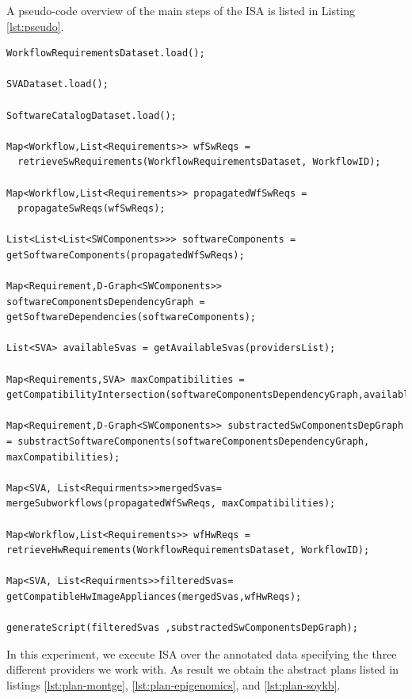A pseudo-code overview of the main steps of the ISA is listed in Listing \ref{lst:pseudo}.

          
\begin{lstlisting}[caption={Pseudo-code overview of the ISA},label={lst:pseudo}]
WorkflowRequirementsDataset.load();

SVADataset.load();

SoftwareCatalogDataset.load();

Map<Workflow,List<Requirements>> wfSwReqs = 
  retrieveSwRequirements(WorkflowRequirementsDataset, WorkflowID);

Map<Workflow,List<Requirements>> propagatedWfSwReqs = 
  propagateSwReqs(wfSwReqs);

List<List<List<SWComponents>>> softwareComponents = getSoftwareComponents(propagatedWfSwReqs);

Map<Requirement,D-Graph<SWComponents>> softwareComponentsDependencyGraph = getSoftwareDependencies(softwareComponents);

List<SVA> availableSvas = getAvailableSvas(providersList);

Map<Requirements,SVA> maxCompatibilities = getCompatibilityIntersection(softwareComponentsDependencyGraph,availableSvas);

Map<Requirement,D-Graph<SWComponents>> substractedSwComponentsDepGraph = substractSoftwareComponents(softwareComponentsDependencyGraph, maxCompatibilities);

Map<SVA, List<Requirments>>mergedSvas= mergeSubworkflows(propagatedWfSwReqs, maxCompatibilities);

Map<Workflow,List<Requirements>> wfHwReqs =   retrieveHwRequirements(WorkflowRequirementsDataset, WorkflowID);

Map<SVA, List<Requirments>>filteredSvas= getCompatibleHwImageAppliances(mergedSvas,wfHwReqs);

generateScript(filteredSvas ,substractedSwComponentsDepGraph);

\end{lstlisting}


In this experiment, we execute ISA over the annotated data specifying the three different providers we work with. As result we obtain the abstract plans listed in listings \ref{lst:plan-montge}, \ref{lst:plan-epigenomics}, and \ref{lst:plan-soykb}. 


